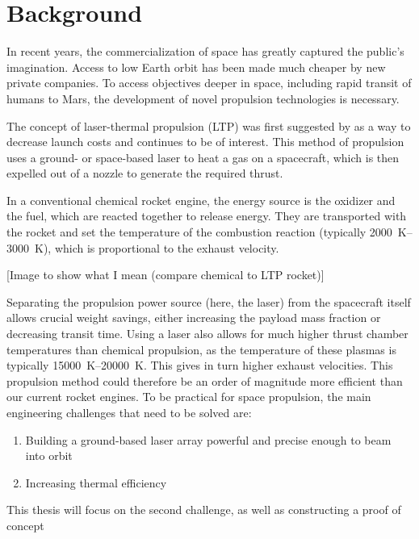 \chapter{Background} \label{chp:background}

    In recent years, the commercialization of space has greatly captured the public's imagination. Access to low Earth orbit has been made much cheaper by new private companies. To access objectives deeper in space, including rapid transit of humans to Mars, the development of novel propulsion technologies is necessary. 
    
    The concept of laser-thermal propulsion (LTP) was first suggested by \textcite{kantrowitzRelevanceSpace1971} as a way to decrease launch costs and continues to be of interest. This method of propulsion uses a ground- or space-based laser to heat a gas on a spacecraft, which is then expelled out of a nozzle to generate the required thrust.

    In a conventional chemical rocket engine, the energy source is the oxidizer and the fuel, which are reacted together to release energy. They are transported with the rocket and set the temperature of the combustion reaction (typically \qtyrange{2000}{3000}{K}), which is proportional to the exhaust velocity.

    [Image to show what I mean (compare chemical to LTP rocket)]
    
    Separating the propulsion power source (here, the laser) from the spacecraft itself allows crucial weight savings, either increasing the payload mass fraction or decreasing transit time. Using a laser also allows for much higher thrust chamber temperatures than chemical propulsion, as the temperature of these plasmas is typically \qtyrange{15000}{20000}{K}. This gives in turn higher exhaust velocities. This propulsion method could therefore be an order of magnitude more efficient than our current rocket engines. To be practical for space propulsion, the main engineering challenges that need to be solved are:

    \begin{enumerate}
        \item Building a ground-based laser array powerful and precise enough to beam into orbit
        \item Increasing thermal efficiency
    \end{enumerate}

    This thesis will focus on the second challenge, as well as constructing a proof of concept 
    
